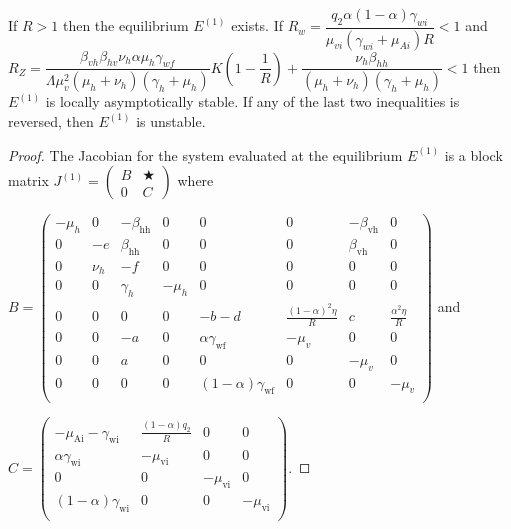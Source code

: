 \documentclass{ws-rv9x6}
\begin{document}
\begin{theorem}
If $R > 1$ then the equilibrium $E^{(1)}$ exists. If $R_w=\dfrac{q_2\alpha(1-\alpha)\gamma_{wi}}{\mu_{vi}(\gamma_{wi}+\mu_{Ai})R}< 1$ and $R_Z=\dfrac{\beta_{vh}\beta_{hv}\nu_h\alpha\mu_h\gamma_{wf}}{\Lambda\mu^2_v(\mu_h+\nu_h)(\gamma_h+\mu_h)}K\left(1-\dfrac{1}{R}\right)
    +\dfrac{\nu_h\beta_{hh}}{(\mu_h+\nu_h)(\gamma_h+\mu_h)} < 1$ then $E^{(1)}$ is locally asymptotically stable. If any of the last two inequalities is reversed, then $E^{(1)}$ is unstable. 
\end{theorem}
\begin{proof}
The Jacobian for the system evaluated at the equilibrium $E^{(1)}$ is a block matrix $J^{(1)}=\left(
\begin{array}{c|c}
    B & \bigstar\\
    \hline
    0 & C
\end{array}
\right)$ where  

\vspace{0.2in}
\noindent $B=\left(
\begin{array}{cccccccc}
 -\mu _h & 0 & -\beta _{\text{hh}} & 0 & 0 & 0 & -\beta _{\text{vh}} & 0 \\%
 0 & -e & \beta _{\text{hh}} & 0 & 0 & 0 & \beta _{\text{vh}} & 0  \\%
 0 & \nu _h & -f & 0 & 0 & 0 & 0 & 0 \\%
 0 & 0 & \gamma _h & -\mu _h & 0 & 0 & 0 & 0 \\%
 0 & 0 & 0 & 0 & -b-d & \frac{(1-\alpha)^2 \eta }{R} & c & \frac{\alpha ^2 \eta }{R}  \\
 0 & 0 & -a & 0 & \alpha  \gamma _{\text{wf}} & -\mu _v & 0 &
   0 \\
 0 & 0 & a & 0 & 0 & 0 & -\mu _v & 0 \\
 0 & 0 & 0 & 0 & (1-\alpha) \gamma _{\text{wf}} & 0 & 0 & -\mu _v\\
\end{array}
\right)$ and

\vspace{0.2in}
\noindent $C=\left(
\begin{array}{cccc} -\mu _{\text{Ai}}-\gamma _{\text{wi}} &
   \frac{(1-\alpha) q_2}{R} & 0 & 0 \\
  \alpha  \gamma _{\text{wi}} & -\mu _{\text{vi}} & 0
   & 0 \\
  0 & 0 & -\mu _{\text{vi}} & 0 \\
  (1-\alpha) \gamma _{\text{wi}} & 0 & 0 & -\mu
   _{\text{vi}} \\
\end{array}
\right).$ 


\end{proof}
\end{document}

